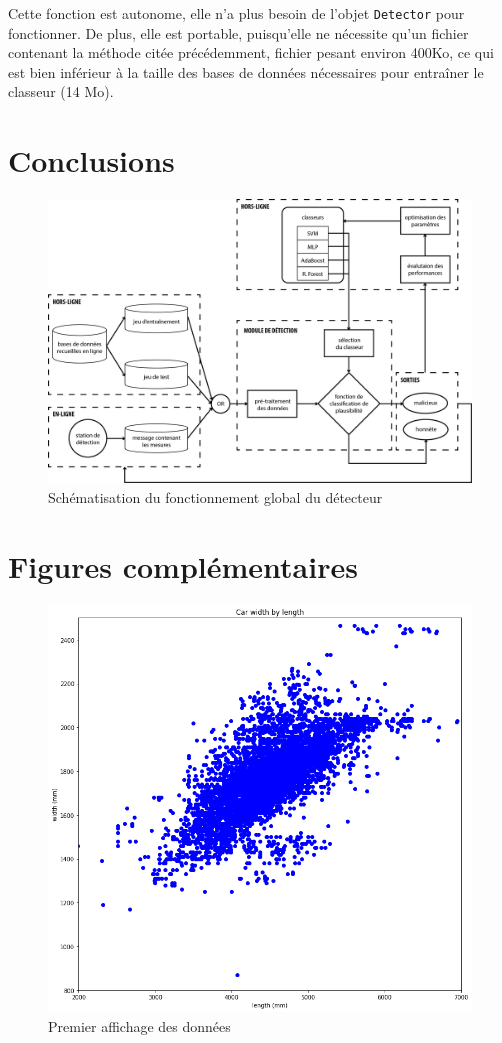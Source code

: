 \documentclass[a4paper]{report}
\begin{document}
Cette fonction est autonome, elle n'a plus besoin de l'objet \texttt{Detector} pour fonctionner. De plus, elle est portable, puisqu'elle ne nécessite qu'un fichier contenant la méthode citée précédemment, fichier pesant environ 400Ko, ce qui est bien inférieur à la taille des bases de données nécessaires pour entraîner le classeur (14 Mo).

\chapter{Conclusions}

\begin{figure}
\centering
\includegraphics[width=\textwidth]{img/structure.png}
\caption{Schématisation du fonctionnement global du détecteur}
\end{figure}





\listoffigures
\begingroup
\let\clearpage\relax
\listoftables
\endgroup

\appendix

\chapter{Figures complémentaires}

\begin{figure}
\centering
\includegraphics[width=\textwidth]{img/first_plot.png}
\caption{Premier affichage des données\label{first_plot}}
\end{figure}
\end{document}
